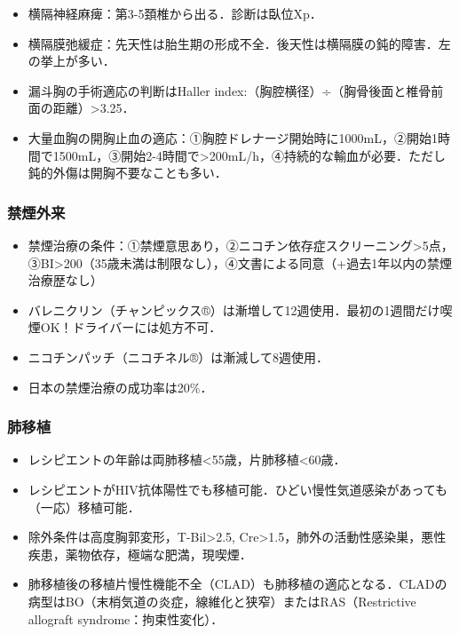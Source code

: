 \begin{itemize}
\item 横隔神経麻痺：第3-5頚椎から出る．診断は臥位Xp．
\item 横隔膜弛緩症：先天性は胎生期の形成不全．後天性は横隔膜の鈍的障害．左の挙上が多い．
\item 漏斗胸の手術適応の判断はHaller index:（胸腔横径）÷（胸骨後面と椎骨前面の距離）>3.25．
\item 大量血胸の開胸止血の適応：①胸腔ドレナージ開始時に1000mL，②開始1時間で1500mL，③開始2-4時間で>200mL/h，④持続的な輸血が必要．ただし鈍的外傷は開胸不要なことも多い．
\end{itemize}


\subsubsection{禁煙外来}

\begin{itemize}
\item 禁煙治療の条件：①禁煙意思あり，②ニコチン依存症スクリーニング>5点，③BI>200（35歳未満は制限なし），④文書による同意（+過去1年以内の禁煙治療歴なし）
\item バレニクリン（チャンピックス®）は漸増して12週使用．最初の1週間だけ喫煙OK！ドライバーには処方不可．
\item ニコチンパッチ（ニコチネル®）は漸減して8週使用．
\item 日本の禁煙治療の成功率は20\%．
\end{itemize}


\subsubsection{肺移植}

\begin{itemize}
\item レシピエントの年齢は両肺移植<55歳，片肺移植<60歳．
\item レシピエントがHIV抗体陽性でも移植可能．ひどい慢性気道感染があっても（一応）移植可能．
\item 除外条件は高度胸郭変形，T-Bil>2.5, Cre>1.5，肺外の活動性感染巣，悪性疾患，薬物依存，極端な肥満，現喫煙．
\item 肺移植後の移植片慢性機能不全（CLAD）も肺移植の適応となる．CLADの病型はBO（末梢気道の炎症，線維化と狭窄）またはRAS（Restrictive allograft syndrome：拘束性変化）．
\end{itemize}
